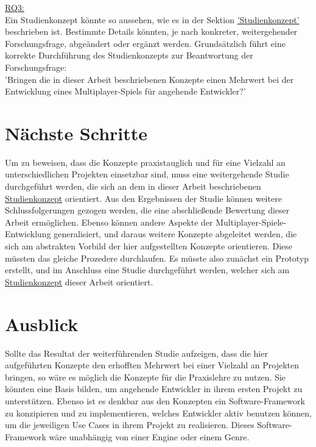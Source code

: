 \hyperref[RQ3]{RQ3:} \\
Ein Studienkonzept könnte so aussehen, wie es in der Sektion \hyperref[studienkonzept]{'Studienkonzept'} beschrieben ist. Bestimmte Details könnten, je nach konkreter, weitergehender Forschungsfrage, abgeändert oder ergänzt werden. Grundsätzlich führt eine korrekte Durchführung des Studienkonzepts zur Beantwortung der Forschungsfrage: \\
'Bringen die in dieser Arbeit beschriebenen Konzepte einen Mehrwert bei der Entwicklung eines Multiplayer-Spiels für angehende Entwickler?'

\section{Nächste Schritte}

Um zu beweisen, dass die Konzepte praxistauglich und für eine Vielzahl an unterschiedlichen Projekten einsetzbar sind, muss eine weitergehende Studie durchgeführt werden, die sich an dem in dieser Arbeit beschriebenen \hyperref[studienkonzept]{Studienkonzept} orientiert. Aus den Ergebnissen der Studie können weitere Schlussfolgerungen gezogen werden, die eine abschließende Bewertung dieser Arbeit ermöglichen. Ebenso können andere Aspekte der Multiplayer-Spiele-Entwicklung generalisiert, und daraus weitere Konzepte abgeleitet werden, die sich am abstrakten Vorbild der hier aufgestellten Konzepte orientieren. Diese müssten das gleiche Prozedere durchlaufen. Es müsste also zunächst ein Prototyp erstellt, und im Anschluss eine Studie durchgeführt werden, welcher sich am \hyperref[studienkonzept]{Studienkonzept} dieser Arbeit orientiert.

\section{Ausblick}

Sollte das Resultat der weiterführenden Studie aufzeigen, dass die hier aufgeführten Konzepte den erhofften Mehrwert bei einer Vielzahl an Projekten bringen, so wäre es möglich die Konzepte für die Praxislehre zu nutzen. Sie könnten eine Basis bilden, um angehende Entwickler in ihrem ersten Projekt zu unterstützen. Ebenso ist es denkbar aus den Konzepten ein Software-Framework zu konzipieren und zu implementieren, welches Entwickler aktiv benutzen können, um die jeweiligen Use Cases in ihrem Projekt zu realisieren. Dieses Software-Framework wäre unabhängig von einer Engine oder einem Genre.